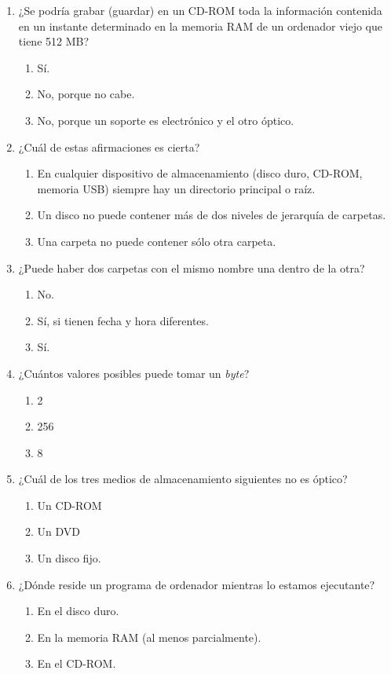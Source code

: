 \begin{enumerate}
\item ¿Se podría grabar (guardar) en un CD-ROM toda la información contenida en un instante determinado en la memoria RAM de un ordenador viejo que tiene 512 MB? \begin{enumerate} \item Sí. \item No, porque no cabe. \item No, porque un soporte es electrónico y el otro óptico. \end{enumerate} 

\item ¿Cuál de estas afirmaciones es cierta? \begin{enumerate} \item En cualquier dispositivo de almacenamiento (disco duro, CD-ROM, memoria USB) siempre hay un directorio principal o raíz. \item Un disco no puede contener más de dos niveles de jerarquía de carpetas. \item Una carpeta no puede contener sólo otra carpeta. \end{enumerate} 

\item ¿Puede haber dos carpetas con el mismo nombre una dentro de la otra? \begin{enumerate} \item No. \item Sí, si tienen fecha y hora diferentes. \item Sí. \end{enumerate} 

\item ¿Cuántos valores posibles puede tomar un \emph{byte}? \begin{enumerate} \item 2 \item 256 \item 8 \end{enumerate} 

\item ¿Cuál de los tres medios de almacenamiento siguientes no es óptico? \begin{enumerate} \item Un CD-ROM \item Un DVD \item Un disco fijo. \end{enumerate} 

\item ¿Dónde reside un programa de ordenador mientras lo estamos ejecutante? \begin{enumerate} \item En el disco duro. \item En la memoria RAM (al menos parcialmente). \item En el CD-ROM. \end{enumerate} 


\end{enumerate}
